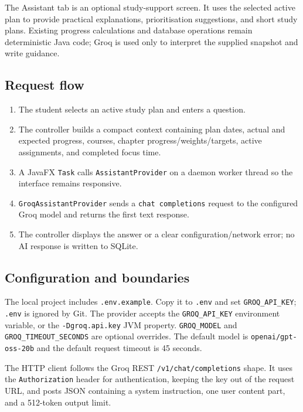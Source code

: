 \documentclass[11pt,a4paper]{article}
\newcommand{\code}[1]{\texttt{#1}}
\begin{document}
The Assistant tab is an optional study-support screen. It uses the selected active plan to provide practical explanations, prioritisation suggestions, and short study plans. Existing progress calculations and database operations remain deterministic Java code; Groq is used only to interpret the supplied snapshot and write guidance.

\subsection{Request flow}

\begin{enumerate}
  \item The student selects an active study plan and enters a question.
  \item The controller builds a compact context containing plan dates, actual and expected progress, courses, chapter progress/weights/targets, active assignments, and completed focus time.
  \item A JavaFX \code{Task} calls \code{AssistantProvider} on a daemon worker thread so the interface remains responsive.
  \item \code{GroqAssistantProvider} sends a \code{chat completions} request to the configured Groq model and returns the first text response.
  \item The controller displays the answer or a clear configuration/network error; no AI response is written to SQLite.
\end{enumerate}

\subsection{Configuration and boundaries}

The local project includes \code{.env.example}. Copy it to \code{.env} and set \code{GROQ\_API\_KEY}; \code{.env} is ignored by Git. The provider accepts the \code{GROQ\_API\_KEY} environment variable, or the \code{-Dgroq.api.key} JVM property. \code{GROQ\_MODEL} and \code{GROQ\_TIMEOUT\_SECONDS} are optional overrides. The default model is \code{openai/gpt-oss-20b} and the default request timeout is 45 seconds.

The HTTP client follows the Groq REST \code{/v1/chat/completions} shape. It uses the \code{Authorization} header for authentication, keeping the key out of the request URL, and posts JSON containing a system instruction, one user content part, and a 512-token output limit.
\end{document}
